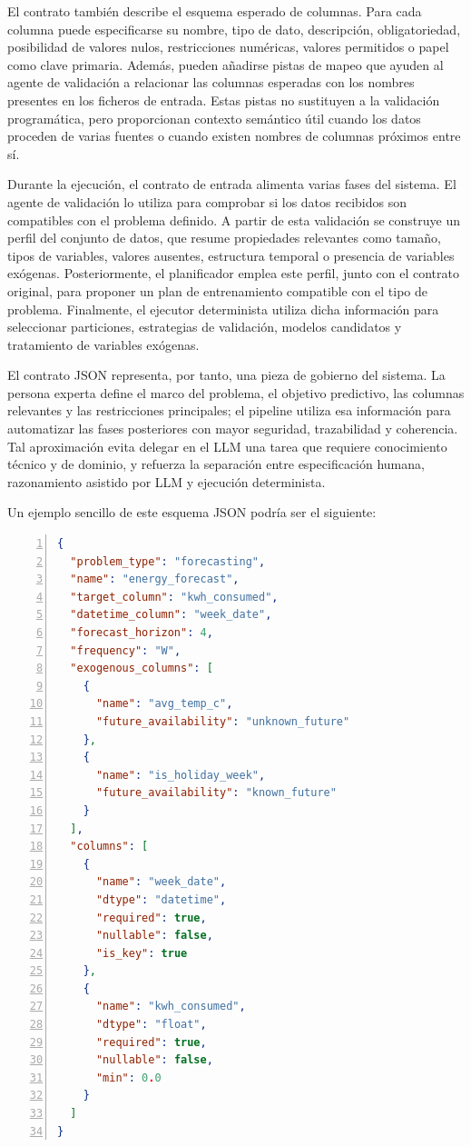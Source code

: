 \documentclass[12pt,a4paper]{article}
\theoremstyle{plain}
\begin{document}
El contrato también describe el esquema esperado de columnas. Para cada columna puede especificarse su nombre, tipo de dato, descripción, obligatoriedad, posibilidad de valores nulos, restricciones numéricas, valores permitidos o papel como clave primaria. Además, pueden añadirse pistas de mapeo que ayuden al agente de validación a relacionar las columnas esperadas con los nombres presentes en los ficheros de entrada. Estas pistas no sustituyen a la validación programática, pero proporcionan contexto semántico útil cuando los datos proceden de varias fuentes o cuando existen nombres de columnas próximos entre sí.

Durante la ejecución, el contrato de entrada alimenta varias fases del sistema. El agente de validación lo utiliza para comprobar si los datos recibidos son compatibles con el problema definido. A partir de esta validación se construye un perfil del conjunto de datos, que resume propiedades relevantes como tamaño, tipos de variables, valores ausentes, estructura temporal o presencia de variables exógenas. Posteriormente, el planificador emplea este perfil, junto con el contrato original, para proponer un plan de entrenamiento compatible con el tipo de problema. Finalmente, el ejecutor determinista utiliza dicha información para seleccionar particiones, estrategias de validación, modelos candidatos y tratamiento de variables exógenas. %

El contrato JSON representa, por tanto, una pieza de gobierno del sistema. La persona experta define el marco del problema, el objetivo predictivo, las columnas relevantes y las restricciones principales; el pipeline utiliza esa información para automatizar las fases posteriores con mayor seguridad, trazabilidad y coherencia. Tal aproximación evita delegar en el LLM una tarea que requiere conocimiento técnico y de dominio, y refuerza la separación entre especificación humana, razonamiento asistido por LLM y ejecución determinista.

Un ejemplo sencillo de este esquema JSON podría ser el siguiente:

\begin{lstlisting}[language=json,
  caption={Ejemplo simplificado de esquema JSON de entrada.},
  label={lst:json-schema-example},
  basicstyle=\ttfamily\small,
  numbers=left,
  numberstyle=\tiny,
  numbersep=8pt,
  frame=single,
  framerule=0.4pt,
  xleftmargin=1.5em,
  tabsize=2,
  breaklines=true,
  breakatwhitespace=true,
  columns=fullflexible,
  showstringspaces=false
]
{
  "problem_type": "forecasting",
  "name": "energy_forecast",
  "target_column": "kwh_consumed",
  "datetime_column": "week_date",
  "forecast_horizon": 4,
  "frequency": "W",
  "exogenous_columns": [
    {
      "name": "avg_temp_c",
      "future_availability": "unknown_future"
    },
    {
      "name": "is_holiday_week",
      "future_availability": "known_future"
    }
  ],
  "columns": [
    {
      "name": "week_date",
      "dtype": "datetime",
      "required": true,
      "nullable": false,
      "is_key": true
    },
    {
      "name": "kwh_consumed",
      "dtype": "float",
      "required": true,
      "nullable": false,
      "min": 0.0
    }
  ]
}
\end{lstlisting}
\end{document}
